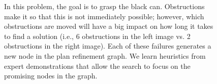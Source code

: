 \begin{figure}[t]
  \caption{\small{In this problem, the goal is to grasp the black
      can. Obstructions make it so that this is not immediately possible; however, which
      obstructions are moved will have a big impact on how long it
      takes to find a solution (i.e., 6 obstructions in the left image
      vs. 2 obstructions in the right image). Each of these failures
      generates a new node in the plan refinement graph. We learn
      heuristics from expert demonstrations that allow the search to
      focus on the promising nodes in the graph.}}
  \label{fig:hlsearch}
\end{figure}

